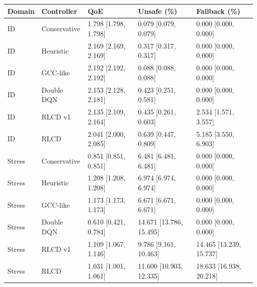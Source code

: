 \begin{tabular}{lllll}
\toprule
Domain & Controller & QoE & Unsafe (\%) & Fallback (\%) \\
\midrule
ID & Conservative & 1.798 [1.798, 1.798] & 0.079 [0.079, 0.079] & 0.000 [0.000, 0.000] \\
ID & Heuristic & 2.169 [2.169, 2.169] & 0.317 [0.317, 0.317] & 0.000 [0.000, 0.000] \\
ID & GCC-like & 2.192 [2.192, 2.192] & 0.088 [0.088, 0.088] & 0.000 [0.000, 0.000] \\
ID & Double DQN & 2.153 [2.128, 2.181] & 0.423 [0.251, 0.581] & 0.000 [0.000, 0.000] \\
ID & RLCD v1 & 2.135 [2.109, 2.164] & 0.435 [0.261, 0.603] & 2.534 [1.571, 3.557] \\
ID & RLCD & 2.041 [2.000, 2.085] & 0.639 [0.447, 0.809] & 5.185 [3.550, 6.903] \\
Stress & Conservative & 0.851 [0.851, 0.851] & 6.481 [6.481, 6.481] & 0.000 [0.000, 0.000] \\
Stress & Heuristic & 1.208 [1.208, 1.208] & 6.974 [6.974, 6.974] & 0.000 [0.000, 0.000] \\
Stress & GCC-like & 1.173 [1.173, 1.173] & 6.671 [6.671, 6.671] & 0.000 [0.000, 0.000] \\
Stress & Double DQN & 0.610 [0.421, 0.784] & 14.671 [13.786, 15.495] & 0.000 [0.000, 0.000] \\
Stress & RLCD v1 & 1.109 [1.067, 1.146] & 9.786 [9.161, 10.463] & 14.465 [13.239, 15.737] \\
Stress & RLCD & 1.031 [1.001, 1.061] & 11.600 [10.903, 12.335] & 18.633 [16.938, 20.218] \\
\bottomrule
\end{tabular}
